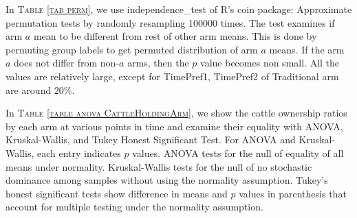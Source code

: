 \vspace{2ex}





In \textsc{\normalsize Table \ref{tab perm}}, we use \textsf{independence\_test} of \textsf{R}'s \textsf{coin} package: Approximate permutation tests by randomly resampling 100000 times. The test examines if arm $a$ mean to be different from rest of other arm means. This is done by permuting group labels to get permuted distribution of arm $a$ means. If the arm $a$ does not differ from non-$a$ arms, then the $p$ value becomes non small. All the values are relatively large, except for \textsf{TimePref1, TimePref2} of \textsf{Traditional} arm are around 20\%.

In \textsc{\normalsize Table \ref{table anova CattleHoldingArm}}, we show the cattle ownership ratios by each arm  at various points in time and examine their equality with ANOVA, Kruskal-Wallis, and Tukey Honest Significant Test. For ANOVA and Kruskal-Wallis, each entry indicates $p$ values. ANOVA tests for the null of equality of all means under normality. Kruskal-Wallis tests for the null of no stochastic dominance among samples without using the normality assumption. Tukey's honest significant tests show difference in means and $p$ values in parenthesis that account for multiple testing under the normality assumption.  

